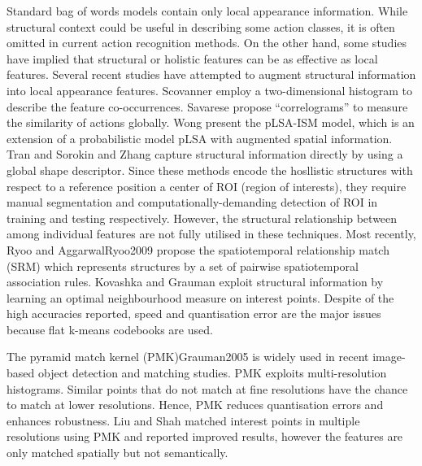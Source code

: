 Standard bag of words models contain only local appearance information. While structural context could be useful in describing some action classes, it is often omitted in current action recognition methods.
On the other hand, some studies \cite{Gorelick2007, Fathi2008, Lin2009, Kim2007} have implied that structural or holistic features can be as effective as local features.
Several recent studies have attempted to augment structural information into local appearance features. Scovanner \etal \cite{Scovanner2007} employ a two-dimensional histogram to describe the feature co-occurrences. Savarese \etal \cite{Savarese2008} propose ``correlograms'' to measure the similarity of actions globally. Wong \etal \cite{Wong2007} present the pLSA-ISM model, which is an extension of a probabilistic model pLSA with augmented spatial information. 
Tran and Sorokin \cite{Tran2008} and Zhang \etal \cite{Zhang2008} capture structural information directly by using a global shape descriptor.
Since these methods \cite{Wong2007,Tran2008, Zhang2008} encode the hosllistic structures with respect to a reference position \eg a center of ROI (region of interests), they require manual segmentation and computationally-demanding detection of ROI in training and testing respectively. 
However, the structural relationship between among individual features are not fully utilised in these techniques.
Most recently, Ryoo and Aggarwal{Ryoo2009} propose the spatiotemporal relationship match (SRM) which represents structures by a set of pairwise spatiotemporal association rules. Kovashka and Grauman \cite{Kovashka2010} exploit structural information by learning an optimal neighbourhood measure on interest points. Despite of the high accuracies reported, speed and quantisation error are the major issues because flat k-means codebooks are used.

The pyramid match kernel (PMK){Grauman2005} is widely used in recent image-based object detection and matching studies. PMK exploits multi-resolution histograms. Similar points that do not match at fine resolutions have the chance to match at lower resolutions. Hence, PMK reduces quantisation errors and enhances robustness. Liu and Shah \cite{Liu2008} matched interest points in multiple resolutions using PMK and reported improved results, however the features are only matched spatially but not semantically.

